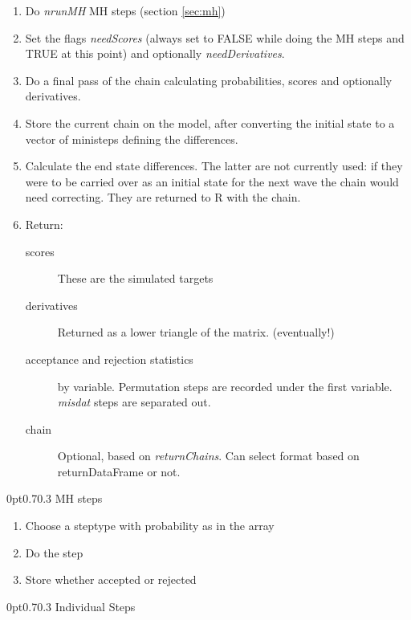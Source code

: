 \documentclass[12pt,a4paper]{article}
\makeatletter
\renewcommand{\=}{\,=\,}
\newcommand{\+}{\,+\,}
\newcommand{\nnm}[1]{\textsf{\small\textit{#1}}}
\newcommand{\R}{{\sf R }}
\renewcommand{\subsection}{\@startsection{subsection}{2}
                {0pt}{0.7\baselineskip}{0.3\baselineskip}
                {\sffamily} }
\makeatother
\begin{document}
\begin{enumerate}
\item Do \nnm{nrunMH} MH steps (section \ref{sec:mh})
\item Set the flags \nnm{needScores} (always set to FALSE while doing the MH
  steps and TRUE at this point) and optionally \nnm{needDerivatives}.
\item Do a final pass of the chain calculating probabilities, scores and
  optionally derivatives.
\item Store the current chain on the model, after converting the initial state
  to a vector of ministeps defining the differences.
\item Calculate the end state differences. The latter are not currently used: if
  they were to be carried over as an initial state for the next wave the chain
  would need correcting. They are returned to \R with the chain.
\item Return:
\begin{description}
\item[scores] These are the simulated targets
\item[derivatives] Returned as a lower triangle of the matrix. (eventually!)
\item[acceptance and rejection statistics] by variable. Permutation steps are
  recorded under the first variable. \nnm{misdat} steps are separated out.
\item[chain] Optional, based on \nnm{returnChains}. Can select format based on
  returnDataFrame or not.
\end{description}
\end{enumerate}

\subsection{MH steps}
\label{sec:mh}
\begin{enumerate}
\item Choose a steptype with probability as in the array
\item Do the step
\item Store whether accepted or rejected
\end{enumerate}
\subsection{Individual Steps}
\end{document}

